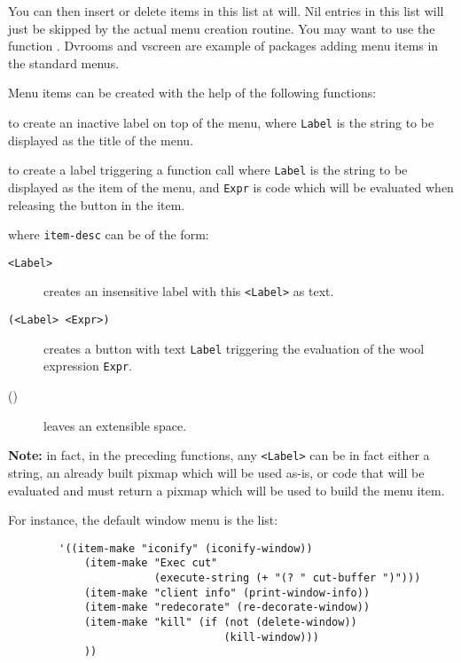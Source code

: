You can then insert or delete items in this list at will. Nil entries in this
list will just be skipped by the actual menu creation routine. You may want to
use the function . Dvrooms and vscreen are example of
packages adding menu items in the standard menus.

Menu items can be created with the help of the following functions:

\begin{description}

to create an inactive label on top of the menu, 
where \verb"Label" is the string to be displayed as the title of the menu.

to create a label triggering a {\WOOL} function call where \verb"Label" is the
string to be displayed as the item of the menu, and \verb"Expr" is {\WOOL}
code which will be evaluated when releasing the button in the item.

 where \verb"item-desc" can be of
the form:
\begin{description}
\item[\verb|<Label>|] creates an insensitive label with this \verb|<Label>| as
text.
\item[\verb|(<Label> <Expr>)|] creates a button with text
\verb|Label| triggering the evaluation of the wool expression \verb|Expr|.
\item[()] leaves an extensible space.
\end{description}

\end{description}

{\bf Note:} in fact, in the preceding functions, any \verb|<Label>| can be in
fact either a string, an already built pixmap which will be used as-is, or
{\WOOL} code that will be evaluated and must return a pixmap which will be
used to build the menu item.

For instance, the default window menu is the list:

{\exemplefont\begin{verbatim}
        '((item-make "iconify" (iconify-window))
            (item-make "Exec cut" 
                       (execute-string (+ "(? " cut-buffer ")")))
            (item-make "client info" (print-window-info))
            (item-make "redecorate" (re-decorate-window))
            (item-make "kill" (if (not (delete-window))
                                  (kill-window)))
            ))
\end{verbatim}}

